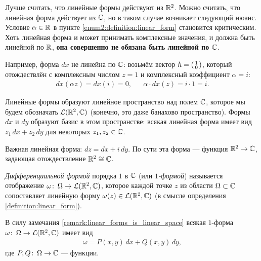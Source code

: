 \documentclass[../complex-analysis.tex]{subfiles}
\begin{document}
\begin{remrk}
 Лучше считать, что линейные формы действуют из $\mathbb{R}^{2}$. Можно считать, что линейная форма действует из $\mathbb{C}$, но в таком случае возникает следующий нюанс. Условие $\alpha \in \mathbb{R}$ в пункте \ref{enum2:definition:linear_form} становится критическим. Хоть линейная форма и может принимать комплексные значения, и должна быть линейной по $\mathbb{R}$, \textbf{она совершенно не обязана быть линейной по $\mathbb{C}$}.

 Например, форма $dx$ не линейна по $\mathbb{C}$: возьмём вектор $h = \begin{psmallmatrix}
  1 \\ 0
 \end{psmallmatrix}$, который отождествлён с комплексным числом $z = 1$ и комплексный коэффициент $\alpha = i$:
 \begin{align*}
  dx(\alpha z) = dx(i) = 0, & &\alpha \cdot dx(z) = i \cdot 1 = i.
 \end{align*} 
\end{remrk}
\begin{remrk}
 \label{remark:linear_forms_is_linear_space}
 Линейные формы образуют линейное пространство над полем $\mathbb{C}$, которое мы будем обозначать $\mathcal{L}(\mathbb{R}^2, \mathbb{C})$ (конечно, это даже банахово пространство). Формы $dx$ и $dy$ образуют базис в этом пространстве: всякая линейная форма имеет вид $z_1\,dx + z_2\,dy$ для некоторых $z_1, z_2 \in \mathbb{C}$.
\end{remrk}
\begin{exmpl*}
 Важная линейная форма: $dz = dx + i\,dy$. По сути эта форма --- функция $\mathbb{R}^{2} \to \mathbb{C}$, задающая отождествление $\mathbb{R}^{2} \cong \mathbb{C}$.
\end{exmpl*}

\begin{df}
 \textit{Дифференциальной формой} порядка $1$ в $\mathbb{C}$ (или \textit{$1$-формой}) называется отображение $\omega \colon\, \Omega \to \mathcal{L}(\mathbb{R}^2, \mathbb{C})$, которое каждой точке $z$ из области $\Omega \subset \mathbb{C}$ сопоставляет линейную форму $\omega(z) \in \mathcal{L}(\mathbb{R}^2, \mathbb{C})$ (в смысле определения \ref{definition:linear_form}).
\end{df}
\begin{remrk*}
 В силу замечания \ref{remark:linear_forms_is_linear_space} всякая $1$-форма $\omega \colon\, \Omega \to \mathcal{L}(\mathbb{R}^2, \mathbb{C})$ имеет вид
 \begin{align}
  \label{equation:1-form}
  \omega = P(x,y)\,dx + Q(x,y)\,dy
 ,\end{align} где $P, Q \colon\, \Omega \to \mathbb{C}$ --- функции.
\end{remrk*}
\end{document}
